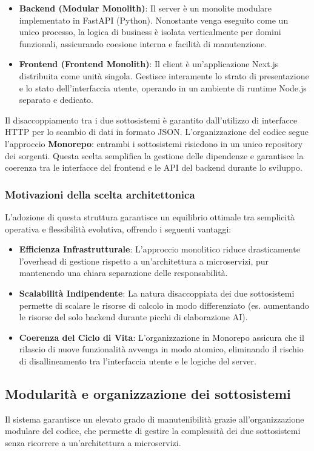 \documentclass[a4paper, 11pt, oneside]{scrartcl}
\begin{document}
\begin{itemize}
    \item \textbf{Backend (Modular Monolith)}: Il server è un monolite modulare implementato in FastAPI (Python). Nonostante venga eseguito come un
      unico processo, la logica di business è isolata verticalmente per domini funzionali, assicurando coesione interna e facilità di manutenzione.
    \item \textbf{Frontend (Frontend Monolith)}: Il client è un'applicazione Next.js distribuita come unità singola. Gestisce interamente lo strato
      di presentazione e lo stato dell'interfaccia utente, operando in un ambiente di runtime Node.js separato e dedicato.
\end{itemize}
Il disaccoppiamento tra i due sottosistemi è garantito dall'utilizzo di interfacce HTTP per lo scambio di dati in formato JSON.
L'organizzazione del codice segue l'approccio \textbf{Monorepo}: entrambi i sottosistemi risiedono in un unico repository dei sorgenti. Questa
scelta semplifica la gestione delle dipendenze e garantisce la coerenza tra le interfacce del frontend e le API del backend durante lo sviluppo.

\subsubsection{Motivazioni della scelta architettonica}
L'adozione di questa struttura garantisce un equilibrio ottimale tra semplicità operativa e flessibilità evolutiva, offrendo i seguenti vantaggi:
\begin{itemize}
    \item \textbf{Efficienza Infrastrutturale}: L'approccio monolitico riduce drasticamente l'overhead di gestione rispetto a un'architettura a
     microservizi, pur mantenendo una chiara separazione delle responsabilità.
    \item \textbf{Scalabilità Indipendente}: La natura disaccoppiata dei due sottosistemi permette di scalare le risorse di calcolo in modo
     differenziato (es. aumentando le risorse del solo backend durante picchi di elaborazione AI).
    \item \textbf{Coerenza del Ciclo di Vita}: L'organizzazione in Monorepo assicura che il rilascio di nuove funzionalità avvenga in modo atomico,
     eliminando il rischio di disallineamento tra l'interfaccia utente e le logiche del server.
\end{itemize}

\subsection{Modularità e organizzazione dei sottosistemi}
Il sistema garantisce un elevato grado di manutenibilità grazie all'organizzazione modulare del codice, che permette di gestire la complessità dei
      due sottosistemi senza ricorrere a un'architettura a microservizi.
\end{document}
